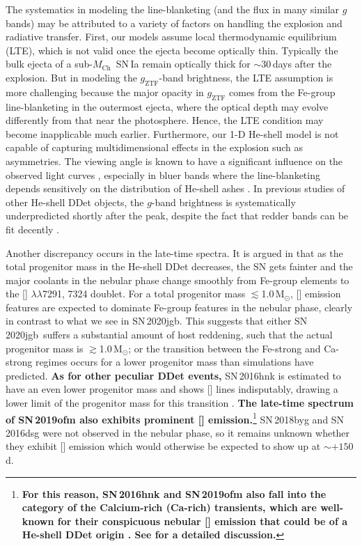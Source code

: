 \documentclass[twocolumn]{aastex631}
\newcommand{\sn}{SN\,2020jgb}
\newcommand{\Mch}{$M_\mathrm{Ch}$}
\newcommand{\Msun}{\mathrm{M_\odot}}
\newcommand{\revise}[1]{\textbf{#1}}
\begin{document}
The systematics in modeling the line-blanketing (and the flux in many similar $g$ bands) may be attributed to a variety of factors on handling the explosion and radiative transfer. First, our models assume local thermodynamic equilibrium (LTE), which is not valid once the ejecta become optically thin. Typically the bulk ejecta of a sub-\Mch\ SN\,Ia remain optically thick for $\sim$30\,days after the explosion. But in modeling the $g_\mathrm{ZTF}$-band brightness, the LTE assumption is more challenging because the major opacity in $g_\mathrm{ZTF}$ comes from the Fe-group line-blanketing in the outermost ejecta, where the optical depth may evolve differently from that near the photosphere. Hence, the LTE condition may become inapplicable much earlier. Furthermore, our 1-D He-shell model is not capable of capturing multidimensional effects in the explosion such as asymmetries. The viewing angle is known to have a significant influence on the observed light curves \citep{Kromer_DD_2010, Sim_2012, Gronow_2020, Shen_2D_2021}, especially in bluer bands where the line-blanketing depends sensitively on the distribution of He-shell ashes \citep{Shen_2D_2021}. In previous studies of other He-shell DDet objects, the $g$-band brightness is systematically underpredicted shortly after the peak, despite the fact that redder bands can be fit decently \citep[e.g.,][]{jiang_16jhr_2017,jacobson-galan_16hnk_2020}.

Another discrepancy occurs in the late-time spectra. It is argued in \citet{polin_nebular_2021} that as the total progenitor mass in the He-shell DDet decreases, the SN gets fainter and the major coolants in the nebular phase change smoothly from Fe-group elements to the [] $\lambda\lambda$7291, 7324 doublet.
For a total progenitor mass $\lesssim$1.0\,$\Msun$, [] emission features are expected to dominate Fe-group features in the nebular phase, clearly in contrast to what we see in \sn. This suggests that either \sn\ suffers a substantial amount of host reddening, such that the actual progenitor mass is $\gtrsim$1.0\,$\Msun$; or the transition between the Fe-strong and Ca-strong regimes occurs for a lower progenitor mass than simulations have predicted.  
\revise{As for other peculiar DDet events,} SN\,2016hnk is estimated to have an even lower progenitor mass \citep[$\sim$0.87\,$\Msun$;][]{jacobson-galan_16hnk_2020} and shows [] lines indisputably, drawing a lower limit of the progenitor mass for this transition \citep[c.f.,][for discussion on the potential host galaxy extinction on SN\,2016hnk]{galbany_16hnk_2019}. \revise{The late-time spectrum of SN\,2019ofm also exhibits prominent [] emission.}\footnote{\revise{For this reason, SN\,2016hnk and SN\,2019ofm also fall into the category of the Calcium-rich (Ca-rich) transients, which are well-known for their conspicuous nebular [\ion{Ca}{2}] emission \citep{Filippenko_2003, Perets_2010, Kasliwal_2012} that could be of a He-shell DDet origin \citep{Dessart_2015,polin_observational_2019}. See \citet{de_Ca_rich_2020} for a detailed discussion.}} SN\,2018byg and SN\,2016dsg were not observed in the nebular phase, so it remains unknown whether they exhibit [] emission which would otherwise be expected to show up at $\sim$$+150$\,d.
\end{document}
